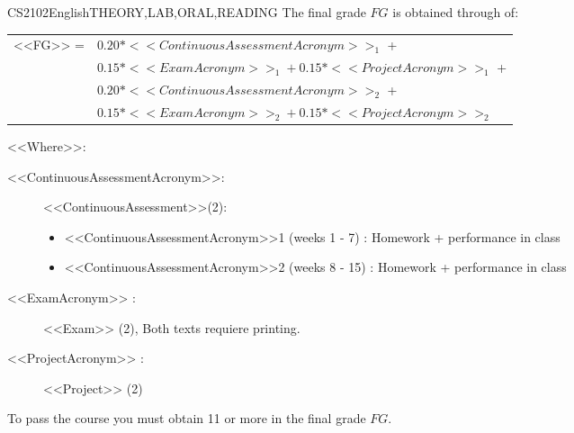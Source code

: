   \begin{evaluation}{CS2102}{English}{THEORY,LAB,ORAL,READING}
  The final grade $FG$ is obtained through of:
 
  \begin{tabular}{cl}
      <<FG>> = & $0.20*<<ContinuousAssessmentAcronym>>_{1}$ +\\
               & $0.15*<<ExamAcronym>>_{1} + 0.15*<<ProjectAcronym>>_{1}$ + \\
               & $0.20*<<ContinuousAssessmentAcronym>>_{2}$ + \\
               & $0.15*<<ExamAcronym>>_{2} + 0.15*<<ProjectAcronym>>_{2}$
  \end{tabular}

  \noindent <<Where>>:
  \begin{description}
            \item[ <<ContinuousAssessmentAcronym>>:] <<ContinuousAssessment>>(2):
            \begin{itemize}
                \item  <<ContinuousAssessmentAcronym>>1 (weeks 1 - 7) : Homework + performance in class
                \item <<ContinuousAssessmentAcronym>>2 (weeks 8 - 15) : Homework + performance in class
       \end{itemize}
      \item[<<ExamAcronym>> :] <<Exam>> (2), Both texts requiere printing.
      \item[<<ProjectAcronym>> :] <<Project>> (2)
  \end{description}
  \noindent To pass the course you must obtain 11 or more in the final grade $FG$.
  \end{evaluation}



